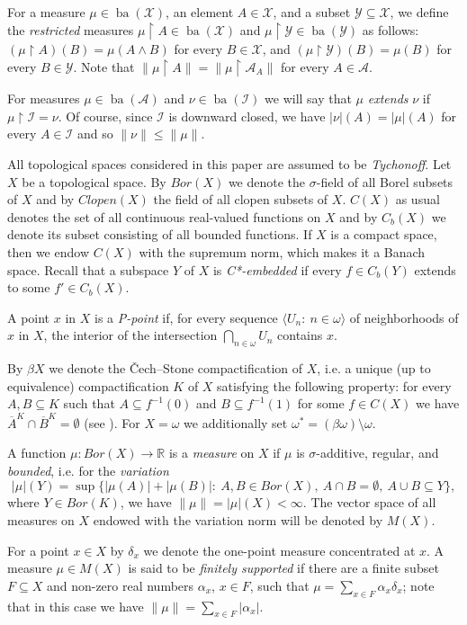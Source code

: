 \documentclass[a4paper,11pt,fleqn]{amsart}
\theoremstyle{definition}
\theoremstyle{remark}
\numberwithin{equation}{section}
\newcommand{\N}{\mathbb{N}}
\newcommand{\R}{\mathbb{R}}
\newcommand{\aA}{\mathcal{A}}
\newcommand{\iI}{\mathcal{I}}
\newcommand{\xX}{\mathcal{X}}
\newcommand{\yY}{\mathcal{Y}}
\DeclareMathOperator{\ba}{ba}
\newcommand{\ol}{\overline}
\newcommand{\rstr}{\restriction}
\newcommand{\sm}{\setminus}
\newcommand{\sub}{\subseteq}
\newcommand{\seqn}[1]{\big\langle#1\colon\ n\io\big\rangle}
\newcommand{\io}{\in\omega}%
\begin{document}
For a measure $\mu\in\ba(\xX)$, an element $A\in\xX$, and a subset $\yY\sub\xX$, we define the \textit{restricted} measures $\mu\rstr A\in\ba(\xX)$ and $\mu\rstr\yY\in\ba(\yY)$ as follows: $(\mu\rstr A)(B)=\mu(A\wedge B)$ for every $B\in\xX$, and $(\mu\rstr\yY)(B)=\mu(B)$ for every $B\in\yY$. Note that $\|\mu\rstr A\|=\|\mu\rstr\aA_A\|$ for every $A\in\aA$. 

For measures $\mu\in\ba(\aA)$ and $\nu\in\ba(\iI)$ we will say that $\mu$ \textit{extends} $\nu$ if $\mu\rstr\iI=\nu$. Of course, since $\iI$ is downward closed, we have $|\nu|(A)=|\mu|(A)$ for every $A\in\iI$ and so $\|\nu\|\le\|\mu\|$.

\medskip

All topological spaces considered in this paper are assumed to be \textit{Tychonoff}. Let $X$ be a topological space. By $Bor(X)$ we denote the $\sigma$-field of all Borel subsets of $X$ and by $Clopen(X)$ the field of all clopen subsets of $X$. $C(X)$ as usual denotes the set of all continuous real-valued functions on $X$ and by $C_b(X)$ we denote its subset consisting of all bounded functions. If $X$ is a compact space, then we endow $C(X)$ with the supremum norm, which makes it a Banach space. Recall that a subspace $Y$ of $X$ is \textit{C*-embedded} if every $f\in C_b(Y)$ extends to some $f'\in C_b(X)$.

A point $x$ in $X$ is a \textit{P-point} if, for every sequence $\seqn{U_n}$ of neighborhoods of $x$ in $X$, the interior of the intersection $\bigcap_{n\io}U_n$ contains $x$.%

By $\beta X$ we denote the \v{C}ech--Stone compactification of $X$, i.e. a unique (up to equivalence) compactification $K$ of $X$ satisfying the following property: for every $A,B\sub K$ such that $A\sub f^{-1}(0)$ and $B\sub f^{-1}(1)$ for some $f\in C(X)$ we have $\ol{A}^K\cap\ol{B}^K=\emptyset$ (see \cite[page 167 and Corollary 3.6.2]{Eng89}). For $X=\omega$ we additionally set $\omega^*=(\beta\omega)\sm\omega$.

A function $\mu\colon Bor(X)\to\R$ is a \textit{measure} on $X$ if $\mu$ is $\sigma$-additive, regular, and \textit{bounded}, i.e. for the \textit{variation}
\[|\mu|(Y)=\sup\big\{|\mu(A)|+|\mu(B)|\colon\ A,B\in Bor(X),\ A\cap B=\emptyset,\ A\cup B\sub Y\big\},\]
where $Y\in Bor(K)$, we have $\|\mu\|=|\mu|(X)<\infty$. The vector space of all measures on $X$ endowed with the variation norm will be denoted by $M(X)$.

For a point $x\in X$ by $\delta_x$ we denote the one-point measure concentrated at $x$. A measure $\mu\in M(X)$ is said to be \textit{finitely supported} if there are a finite subset $F\sub X$ and non-zero real numbers $\alpha_x$, $x\in F$, such that $\mu=\sum_{x\in F}\alpha_x\delta_x$; note that in this case we have $\|\mu\|=\sum_{x\in F}\big|\alpha_x\big|$.
\end{document}
